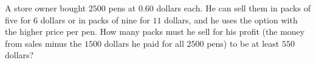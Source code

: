 A store owner bought $2500$ pens at $0.60$ dollars each. He can sell them in packs of five for $6$ dollars or in packs of nine for $11$ dollars, and he uses the option with the higher price per pen. How many packs must he sell for his profit (the money from sales minus the $1500$ dollars he paid for all $2500$ pens) to be at least $550$ dollars?

